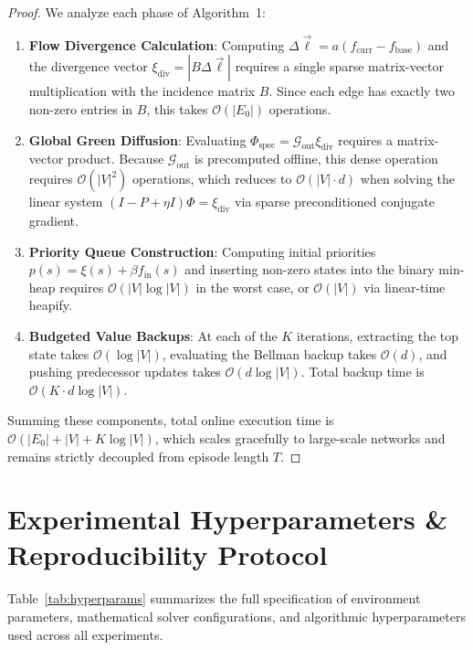 \documentclass[11pt,a4paper]{article}
\begin{document}
\begin{proof}
We analyze each phase of Algorithm~1:
\begin{enumerate}
    \item \textbf{Flow Divergence Calculation}: Computing $\Delta \vec{\ell} = a (f_{\text{curr}} - f_{\text{base}})$ and the divergence vector $\xi_{\text{div}} = |B \Delta \vec{\ell}|$ requires a single sparse matrix-vector multiplication with the incidence matrix $B$. Since each edge has exactly two non-zero entries in $B$, this takes $\mathcal{O}(|E_0|)$ operations.
    \item \textbf{Global Green Diffusion}: Evaluating $\Phi_{\text{spec}} = \mathcal{G}_{\text{out}} \xi_{\text{div}}$ requires a matrix-vector product. Because $\mathcal{G}_{\text{out}}$ is precomputed offline, this dense operation requires $\mathcal{O}(|V|^2)$ operations, which reduces to $\mathcal{O}(|V| \cdot d)$ when solving the linear system $(I - P + \eta I) \Phi = \xi_{\text{div}}$ via sparse preconditioned conjugate gradient.
    \item \textbf{Priority Queue Construction}: Computing initial priorities $p(s) = \xi(s) + \beta f_{\text{in}}(s)$ and inserting non-zero states into the binary min-heap requires $\mathcal{O}(|V| \log |V|)$ in the worst case, or $\mathcal{O}(|V|)$ via linear-time heapify.
    \item \textbf{Budgeted Value Backups}: At each of the $K$ iterations, extracting the top state takes $\mathcal{O}(\log |V|)$, evaluating the Bellman backup takes $\mathcal{O}(d)$, and pushing predecessor updates takes $\mathcal{O}(d \log |V|)$. Total backup time is $\mathcal{O}(K \cdot d \log |V|)$.
\end{enumerate}
Summing these components, total online execution time is $\mathcal{O}(|E_0| + |V| + K \log |V|)$, which scales gracefully to large-scale networks and remains strictly decoupled from episode length $T$.
\end{proof}

\section{Experimental Hyperparameters \& Reproducibility Protocol}
\label{sec:appendix_hyperparams}

Table~\ref{tab:hyperparams} summarizes the full specification of environment parameters, mathematical solver configurations, and algorithmic hyperparameters used across all experiments.
\end{document}
